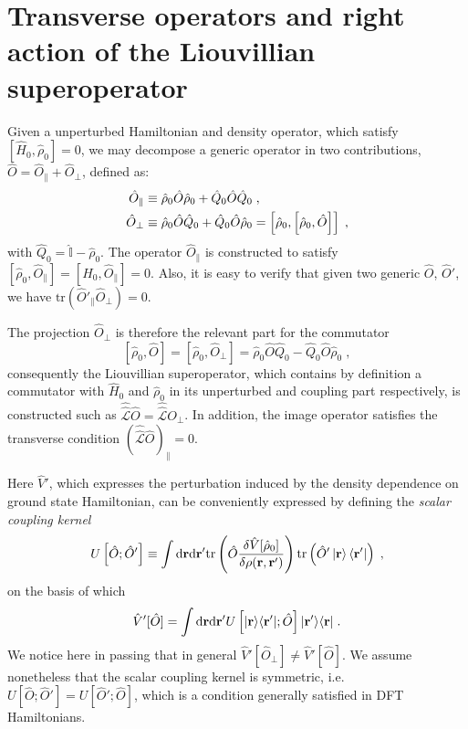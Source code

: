 \documentclass[reprint,aps,prb]{revtex4-1}
\newcommand{\dd}{{\rm d}}
\renewcommand{\r}{{\bf r}}
\newcommand{\be}{\begin{equation}}
\newcommand{\ee}{\end{equation}}
\newcommand{\nn}{\notag}
\newcommand{\lb}{\label}
\newcommand{\op}[1]{\hat {#1}}
\newcommand{\sop}[1]{\op{\op {#1}}}
\newcommand{\commutator}[2]{\left[ {#1} , {#2} \right]}
\newcommand{\trace}[1]{\mathrm{tr}\left(#1\right)}
\newcommand{\ketbra}[2]{| #1 \rangle \langle #2 |}
\newcommand{\dmnot}{\op{\rho}_0}
\newcommand{\hnot}{\op{H}_0}
\newcommand{\Liouv}{\sop{\mathcal L}}
\newcommand{\identity}{\op{\mathbb I}}
\begin{document}
\section{Transverse operators and right action of the Liouvillian superoperator}\lb{LiouvillianAction}
Given a unperturbed Hamiltonian and density operator, which satisfy $\commutator{\hnot}{\dmnot}=0$, we may decompose a generic operator in two contributions, $\op O=\op O_\parallel + \op O_\perp$, defined as:
\begin{align}
\op O_\parallel &\equiv \dmnot \op O \dmnot + \op Q_0 \op O \op Q_0 \nn \;,\\
\op O_\perp &\equiv \dmnot \op O \op Q_0 +  \op Q_0 \op O \dmnot =
\commutator{\dmnot}{\commutator{\dmnot}{\op O}} \;,
\end{align}
with $\op Q_0 =\identity - \dmnot$.
The operator $\op O_\parallel$ is constructed to satisfy
$\commutator{\dmnot}{\op O_\parallel} = \commutator{\hnot}{\op O_\parallel} =0$.
Also, it is easy to verify that given two generic $\op O$, $\op O'$, we have
$\trace{\op O'_\parallel \op O_\perp} =0$.

The projection $\op O_\perp$ is therefore the relevant part for the commutator
\begin{equation}
\commutator{\dmnot}{\op O} = \commutator{\dmnot}{\op O_\perp} =
\dmnot \op O \op Q_0  - \op Q_0 \op O \dmnot  \;,
\end{equation}
consequently the Liouvillian superoperator, which contains by definition a commutator with $\hnot$ and $\dmnot$ in its unperturbed and coupling part respectively,
is constructed such as $\Liouv \op O = \Liouv O_\perp$. In addition, the image operator satisfies the transverse condition
$\left( \Liouv \op O \right)_\parallel =0$.

Here $\op V'$, which expresses the perturbation induced by the density dependence on ground state Hamiltonian, can be conveniently expressed by defining the
\emph{scalar coupling kernel}
\be\lb{CouplingKernelDef1}
U\left[\op O; \op O'\right] \equiv  \int \dd \r \dd \r' \trace{\op O \frac{\delta \op V[\dmnot] }{\delta \rho(\r,\r')}
} \trace{\op O' \ket{\r} \bra{\r'}}\;,
\ee
on the basis of which
\be\lb{VpDef1}
\op V'[\op O]=
\int \dd \r \dd \r' U\left[\ketbra{\r}{\r'};\op O\right] \ketbra{\r'}{\r}\;.
\ee
We notice here in passing that in general $\op V'[\op O_\perp] \neq \op V'[\op O]$.
We assume nonetheless that the scalar coupling kernel is symmetric, i.e. $U\left[\op O; \op O'\right] = U\left[\op O'; \op O\right]$, which is a condition generally satisfied in DFT Hamiltonians.
\end{document}
